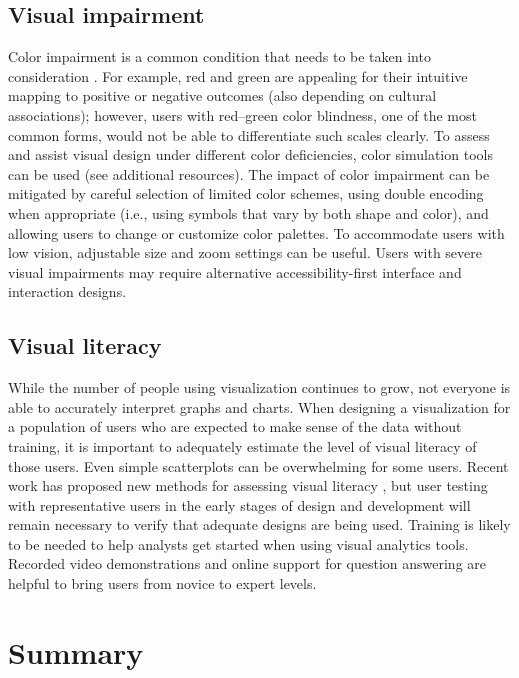 \documentclass[]{krantz}
\begin{document}
\subsection{Visual impairment}\label{sec:viz-4.3}

Color impairment is a common condition that needs to be taken into
consideration \citep{olson1997evaluation}. For example, red and green
are appealing for their intuitive mapping to positive or negative
outcomes (also depending on cultural associations); however, users with
red--green color blindness, one of the most common forms, would not be
able to differentiate such scales clearly. To assess and assist visual
design under different color deficiencies, color simulation tools can be
used (see additional resources). The impact of color impairment can be
mitigated by careful selection of limited color schemes, using double
encoding when appropriate (i.e., using symbols that vary by both shape
and color), and allowing users to change or customize color palettes. To
accommodate users with low vision, adjustable size and zoom settings can
be useful. Users with severe visual impairments may require alternative
accessibility-first interface and interaction designs.

\subsection{Visual literacy}\label{sec:viz-4.4}

While the number of people using visualization continues to grow, not
everyone is able to accurately interpret graphs and charts. When
designing a visualization for a population of users who are expected to
make sense of the data without training, it is important to adequately
estimate the level of visual literacy of those users. Even simple
scatterplots can be overwhelming for some users. Recent work has
proposed new methods for assessing visual literacy
\citep{boy2014principled}, but user testing with representative users in
the early stages of design and development will remain necessary to
verify that adequate designs are being used. Training is likely to be
needed to help analysts get started when using visual analytics tools.
Recorded video demonstrations and online support for question answering
are helpful to bring users from novice to expert levels.

\section{Summary}\label{sec:viz-5}
\end{document}
